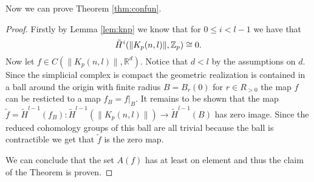 Now we can prove Theorem \ref{thm:confun}.
\begin{proof}
  Firstly by Lemma \ref{lem:knp} we know that for $0 \leq i < l-1$ we have that \[\tilde{H}^i(\lVert K_p(n,l) \rVert, \mathbb{Z}_p) \cong 0.\] Now let $f\in C(\lVert K_p(n,l) \rVert, \mathbb{R}^d)$. Notice that $d < l$ by the assumptions on $d$. Since the simplicial complex is compact the geometric realization is contained in a ball around the origin with finite radius $B = B_r(0)$ for $r \in R_{>0}$ the map $f$ can be resticted to a map $f_B = f|_B$. It remains to be shown that the map $\tilde{f} = \tilde{H}^{l-1}(f_B)\colon \tilde{H}^{l-1}(\lVert K_p(n,l) \rVert) \to \tilde{H}^{l-1}(B)$ has zero image.
  Since the reduced cohomology groups of this ball are all trivial because the ball is contractible we get that $\tilde{f}$ is the zero map.

  We can conclude that the set $A(f)$ has at least on element and thus the claim of the Theorem is proven.
\end{proof}
